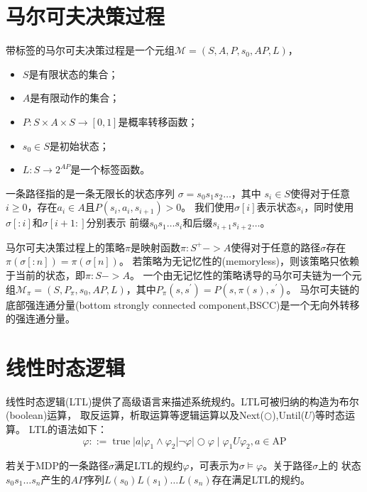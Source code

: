 \section{马尔可夫决策过程}
\begin{definition}[MDP]
带标签的马尔可夫决策过程是一个元组$\mathcal{M} =(S,A,P,s_0,AP,L) $，
\begin{itemize}
\item $S$是有限状态的集合；
\item $A$是有限动作的集合；
\item $P:S\times A\times S \rightarrow [0,1]$是概率转移函数；
\item $s_0 \in S$是初始状态；
\item $L:S \rightarrow 2^{AP}$是一个标签函数。
\end{itemize}
一条路径指的是一条无限长的状态序列 $ \sigma  = s_0 s_1 s_2 \dots$，其中
$s_i \in S$使得对于任意$i \geqslant 0 $，存在$a_i \in A$且$P(s_i,a_i,s_{i+1}) > 0 $。
我们使用$\sigma[i]$表示状态$s_i$，同时使用$\sigma[:i]$和$\sigma[i+1:]$分别表示
前缀$s_{0}s_{1} \dots s_{i}$和后缀$s_{i+1}s_{i+2}\dots$。
\end{definition}
\begin{definition}[Policy]
马尔可夫决策过程上的策略$\pi$是映射函数$\pi:S^{+}->A$使得对于任意的路径$\sigma$存在$\pi(\sigma[:n])=\pi(\sigma[n])$。
若策略为无记忆性的(memoryless)，则该策略只依赖于当前的状态，即$\pi:S->A$。
一个由无记忆性的策略诱导的马尔可夫链为一个元组$\mathcal{M}_{\pi}=(S,P_{\pi},s_0,AP,L) $，其中$P_{\pi}(s,s^{\prime})=P(s,\pi(s),s^{\prime})$。
马尔可夫链的底部强连通分量(bottom strongly connected component,BSCC)是一个无向外转移的强连通分量。
\end{definition}

\section{线性时态逻辑}
线性时态逻辑(LTL)提供了高级语言来描述系统规约。LTL可被归纳的构造为布尔(boolean)运算，
取反运算，析取运算等逻辑运算以及Next($ \bigcirc $),Until($U$)等时态运算。
LTL的语法如下：
\begin{equation}
    \varphi::=\operatorname{true}|a| \varphi_1 \wedge \varphi_2|\neg \varphi| \bigcirc \varphi \mid \varphi_1 U \varphi_2, a \in \mathrm{AP}
\end{equation}
\begin{definition}
若关于MDP的一条路径$\sigma$满足LTL的规约$\varphi$，可表示为$\sigma \models \varphi$。关于路径$\sigma$上的
状态$s_0 s_1 \dots s_n$产生的$AP$序列$L(s_0) L(s_1) \dots L(s_n)$存在满足LTL的规约。
\end{definition}

